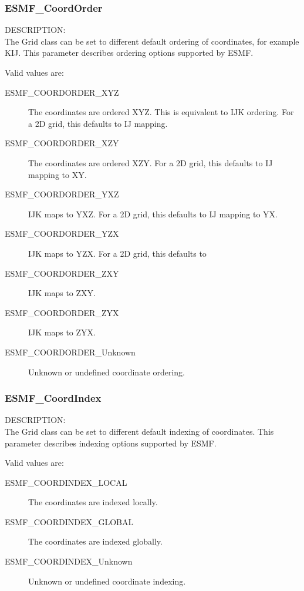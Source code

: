 \subsubsection{ESMF\_CoordOrder}

{\sf DESCRIPTION:\\}
The Grid class can be set to different default ordering of coordinates, for
example KIJ.  This parameter describes ordering options supported by ESMF.

Valid values are:
\begin{description}
   \item [ESMF\_COORDORDER\_XYZ]
         The coordinates are ordered XYZ.  This is equivalent to IJK ordering.
         For a 2D grid, this defaults to IJ mapping.

   \item [ESMF\_COORDORDER\_XZY]
         The coordinates are ordered XZY.  For a 2D grid, this defaults to IJ mapping to XY.

   \item [ESMF\_COORDORDER\_YXZ]
         IJK maps to YXZ.  For a 2D grid, this defaults to IJ mapping to YX.

   \item [ESMF\_COORDORDER\_YZX]
         IJK maps to YZX.  For a 2D grid, this defaults to

   \item [ESMF\_COORDORDER\_ZXY]
         IJK maps to ZXY.

   \item [ESMF\_COORDORDER\_ZYX]
         IJK maps to ZYX.

   \item [ESMF\_COORDORDER\_Unknown]
         Unknown or undefined coordinate ordering.
\end{description}

\subsubsection{ESMF\_CoordIndex}

{\sf DESCRIPTION:\\}
The Grid class can be set to different default indexing of coordinates.  This
parameter describes indexing options supported by ESMF.

Valid values are:
\begin{description}
   \item [ESMF\_COORDINDEX\_LOCAL]
         The coordinates are indexed locally.  

   \item [ESMF\_COORDINDEX\_GLOBAL]
         The coordinates are indexed globally.

   \item [ESMF\_COORDINDEX\_Unknown]
         Unknown or undefined coordinate indexing.
\end{description}

